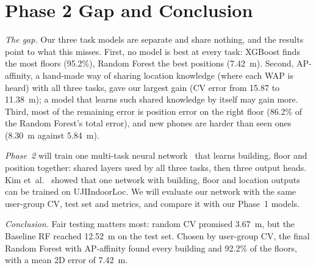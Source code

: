\section{Phase 2 Gap and Conclusion}\label{sec:conclusion}

\emph{The gap.} Our three task models are separate and share nothing, and the
results point to what this misses. First, no model is best at every task:
XGBoost finds the most floors (95.2\%), Random Forest the best positions
(7.42~m). Second, AP-affinity, a
hand-made way of sharing location knowledge (where each WAP is heard) with all
three tasks, gave our largest gain (CV error from 15.87 to 11.38~m); a model
that learns such shared knowledge by itself may gain more. Third, most of the
remaining error is position error on the right floor (86.2\% of the Random
Forest's total error), and new phones are harder than seen ones (8.30~m
against 5.84~m).

\emph{Phase~2} will train one multi-task neural
network~\cite{caruana1997multitask} that learns building, floor and position
together: shared layers used by all three tasks, then three output heads. Kim
et~al.~\cite{kim2018scalable} showed that one network with building, floor and
location outputs can be trained on UJIIndoorLoc. We will evaluate our network
with the same user-group CV, test set and metrics, and compare it with our
Phase~1 models.

\emph{Conclusion.} Fair testing matters most: random CV promised 3.67~m, but
the Baseline RF reached 12.52~m on the test set. Chosen by user-group CV, the
final Random Forest with AP-affinity found every building and 92.2\% of the
floors, with a mean 2D error of 7.42~m.
